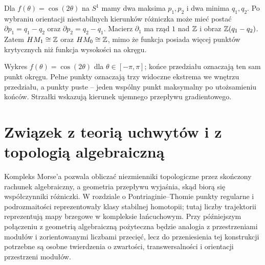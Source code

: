 \begin{przyklad}
Dla $f(\theta)=\cos(2\theta)$ na $S^1$ mamy dwa maksima
$p_1,p_2$ i dwa minima $q_1,q_2$. Po wybraniu orientacji
niestabilnych kierunków różniczka może mieć postać
$\partial p_1=q_1-q_2$ oraz $\partial p_2=q_2-q_1$.
Macierz $\partial_1$ ma rząd $1$ nad $\mathbb{Z}$ i obraz
$\mathbb{Z}(q_1-q_2)$. Zatem $HM_1\cong\mathbb{Z}$ oraz
$HM_0\cong\mathbb{Z}$, mimo że funkcja posiada więcej punktów
krytycznych niż funkcja wysokości na okręgu.
\end{przyklad}

\begin{center}
\end{center}
\begin{center}\small Wykres $f(\theta)=\cos(2\theta)$ dla
$\theta\in[-\pi,\pi]$; końce przedziału oznaczają ten sam
punkt okręgu. Pełne punkty oznaczają trzy widoczne ekstrema
we wnętrzu przedziału, a punkty puste -- jeden wspólny
punkt maksymalny po utożsamieniu końców. Strzałki wskazują
kierunek ujemnego przepływu gradientowego.\end{center}

\section{Związek z teorią uchwytów i z topologią algebraiczną}
Kompleks Morse'a pozwala obliczać niezmienniki topologiczne
przez skończony rachunek algebraiczny, a geometria przepływu
wyjaśnia, skąd biorą się współczynniki różniczki.
W rozdziale o Pontriaginie--Thomie punkty regularne
i podrozmaitości reprezentowały klasy stabilnej homotopii;
tutaj liczby trajektorii reprezentują mapy brzegowe w
kompleksie łańcuchowym. Przy późniejszym połączeniu z geometrią algebraiczną
pożyteczna będzie analogia z przestrzeniami modułów i
zorientowanymi liczbami przecięć, lecz do przeniesienia tej
konstrukcji potrzebne są osobne twierdzenia o zwartości,
transwersalności i orientacji przestrzeni modułów.


